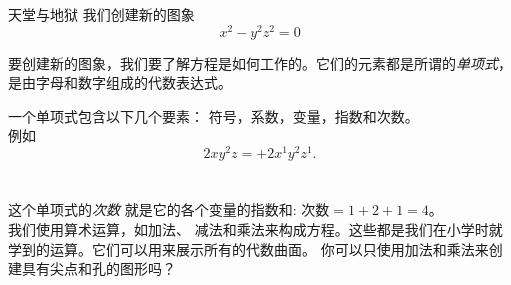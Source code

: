 ﻿\begin{surferPage}{天堂与地狱}
我们创建新的图象\\
\smallskip
\[x^2	- y^2z^2	= 0\]

\singlespacing
要创建新的图象，我们要了解方程是如何工作的。它们的元素都是所谓的{\it 单项式}，是由字母和数字组成的代数表达式。

\singlespacing
一个单项式包含以下几个要素：
符号，系数，变量，指数和次数。\\

\singlespacing
例如
\smallskip
\[2xy^2z = +2x^1y^2z^1.\]
\\
\smallskip
\\
这个单项式的{\it 次数} 就是它的各个变量的指数和: 次数$ = 1+2+1=4$。\\

\singlespacing
我们使用算术运算，如加法、 减法和乘法来构成方程。这些都是我们在小学时就学到的运算。它们可以用来展示所有的代数曲面。
\singlespacing
你可以只使用加法和乘法来创建具有尖点和孔的图形吗？
\end{surferPage}

